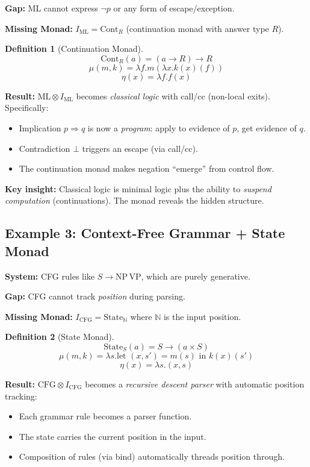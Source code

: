 \documentclass[a4paper,11pt]{article}
\theoremstyle{definition}
\newtheorem{definition}{Definition}[section]
\begin{document}
\textbf{Gap:} ML cannot express $\neg p$ or any form of escape/exception.

\textbf{Missing Monad:} $I_{\text{ML}} = \text{Cont}_R$ (continuation monad with answer type $R$).

\begin{definition}[Continuation Monad]
\[\text{Cont}_R(a) = (a \to R) \to R\]
\[\mu(m, k) = \lambda f. m(\lambda x. k(x)(f))\]
\[\eta(x) = \lambda f. f(x)\]
\end{definition}

\textbf{Result:} $\text{ML} \otimes I_{\text{ML}}$ becomes \emph{classical logic} with call/cc (non-local exits). Specifically:
\begin{itemize}
  \item Implication $p \Rightarrow q$ is now a \emph{program}: apply to evidence of $p$, get evidence of $q$.
  \item Contradiction $\bot$ triggers an escape (via call/cc).
  \item The continuation monad makes negation ``emerge'' from control flow.
\end{itemize}

\textbf{Key insight:} Classical logic is minimal logic plus the ability to \emph{suspend computation} (continuations). The monad reveals the hidden structure.

\subsection{Example 3: Context-Free Grammar + State Monad}

\textbf{System:} CFG rules like $S \to \text{NP} \, \text{VP}$, which are purely generative.

\textbf{Gap:} CFG cannot track \emph{position} during parsing.

\textbf{Missing Monad:} $I_{\text{CFG}} = \text{State}_{\mathbb{N}}$ where $\mathbb{N}$ is the input position.

\begin{definition}[State Monad]
\[\text{State}_S(a) = S \to (a \times S)\]
\[\mu(m, k) = \lambda s. \text{let } (x, s') = m(s) \text{ in } k(x)(s')\]
\[\eta(x) = \lambda s. (x, s)\]
\end{definition}

\textbf{Result:} $\text{CFG} \otimes I_{\text{CFG}}$ becomes a \emph{recursive descent parser} with automatic position tracking:
\begin{itemize}
  \item Each grammar rule becomes a parser function.
  \item The state carries the current position in the input.
  \item Composition of rules (via bind) automatically threads position through.
\end{itemize}
\end{document}
